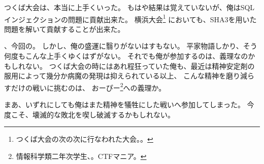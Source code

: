 つくば大会は、本当に上手くいった。
もはや結果は覚えていないが、俺はSQLインジェクションの問題に貢献出来た。
横浜大会\footnote{つくば大会の次の次に行なわれた大会。。}%
においても、SHA3を用いた問題を解いて貢献することが出来た。

、今回の。
しかし、俺の盛運に翳りがないはすもない。
平家物語しかり、そう何度もこんな上手くゆくはずがない。
それでも俺が参加するのは、義理なのかもしれない。
つくば大会の時にはあれ程狂っていた俺も、最近は精神安定剤の服用によって幾分か病魔の発現は抑えられている以上、
こんな精神を磨り減らすだけの戦いに挑むのは、
おーぴー\footnote{情報科学類二年次学生、。CTFマニア。}への義理か。

まあ、いずれにしても俺はまた精神を犠牲にした戦いへ参加してしまった。
今度こそ、壊滅的な敗北を喫し破滅するかもしれない。
